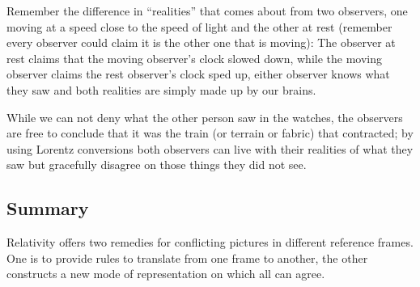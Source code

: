 \documentclass[12pt, letterpaper]{article}
\begin{document}
    \medskip
    Remember the difference in ``realities'' that comes about from two observers, 
    one moving at a speed close to the speed of light and the other at rest 
    (remember every observer could claim it is the other one that is moving):
    The observer at rest claims that the moving observer's clock slowed 
    down, while the moving observer claims the rest observer's clock sped 
    up, either observer knows what they saw and both realities are simply 
    made up by our brains. 
    
    While we can not deny what the other person saw in the watches, the 
    observers are free to conclude that it was the train (or terrain or 
    fabric) that contracted; by using Lorentz conversions both observers 
    can live with their realities of what they saw but gracefully disagree 
    on those things they did not see.
        
    \subsection*{Summary}
    Relativity offers two remedies for conflicting pictures in different reference 
    frames. One is to provide rules to translate from one frame to another, the 
    other constructs a new mode of representation on which all can agree. 
    
\end{document}
